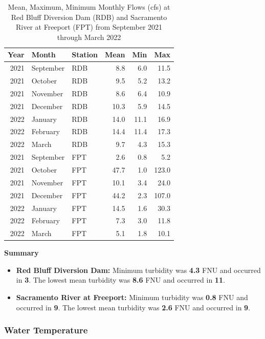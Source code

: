 \documentclass[
]{book}
\providecommand{\tightlist}{%
  \setlength{\itemsep}{0pt}\setlength{\parskip}{0pt}}
\theoremstyle{definition}
\theoremstyle{definition}
\theoremstyle{definition}
\theoremstyle{definition}
\theoremstyle{remark}
\begin{document}
\begin{table}
\centering
\caption{Mean, Maximum, Minimum Monthly Flows (cfs) at Red Bluff Diversion Dam (RDB) and Sacramento River at Freeport (FPT) from September 2021 through March 2022}
\centering
\begin{tabular}[t]{rllrrr}
\hline
Year & Month & Station & Mean & Min & Max\\
\hline
2021 & September & RDB & 8.8 & 6.0 & 11.5\\
\hline
2021 & October & RDB & 9.5 & 5.2 & 13.2\\
\hline
2021 & November & RDB & 8.6 & 6.4 & 10.9\\
\hline
2021 & December & RDB & 10.3 & 5.9 & 14.5\\
\hline
2022 & January & RDB & 14.0 & 11.1 & 16.9\\
\hline
2022 & February & RDB & 14.4 & 11.4 & 17.3\\
\hline
2022 & March & RDB & 9.7 & 4.3 & 15.3\\
\hline
2021 & September & FPT & 2.6 & 0.8 & 5.2\\
\hline
2021 & October & FPT & 47.7 & 1.0 & 123.0\\
\hline
2021 & November & FPT & 10.1 & 3.4 & 24.0\\
\hline
2021 & December & FPT & 44.2 & 2.3 & 107.0\\
\hline
2022 & January & FPT & 14.5 & 1.6 & 30.3\\
\hline
2022 & February & FPT & 7.3 & 3.0 & 11.8\\
\hline
2022 & March & FPT & 5.1 & 1.8 & 10.1\\
\hline
\end{tabular}
\end{table}

\textbf{Summary}

\begin{itemize}
\tightlist
\item
  \textbf{Red Bluff Diversion Dam:} Minimum turbidity was \textbf{4.3} FNU and occurred in \textbf{3}. The lowest mean turbidity was \textbf{8.6} FNU and occurred in \textbf{11}.
\item
  \textbf{Sacramento River at Freeport:} Minimum turbidity was \textbf{0.8} FNU and occurred in \textbf{9}. The lowest mean turbidity was \textbf{2.6} FNU and occurred in \textbf{9}.
\end{itemize}

\hypertarget{water-temperature-2}{%
\subsubsection{Water Temperature}\label{water-temperature-2}}
\end{document}
